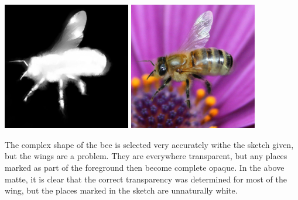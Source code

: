\begin{center}
\includegraphics[width=2.2in]{fig/bee_result.jpg}
\hspace{.2in}
\includegraphics[width=2.2in]{fig/bee_on_flower.jpg}
\end{center}
The complex shape of the bee is selected very accurately withe the sketch given, but the wings are a problem. They are everywhere transparent, but any places marked as part of the foreground then become complete opaque. In the above matte, it is clear that the correct transparency was determined for most of the wing, but the places marked in the sketch are unnaturally white.
